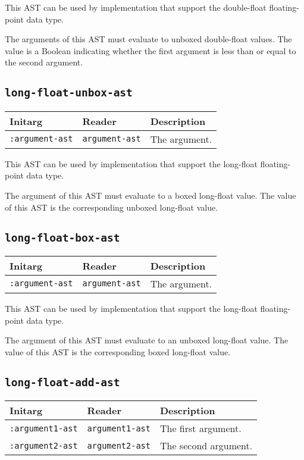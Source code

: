 This AST can be used by implementation that support the double-float
floating-point data type.  

The arguments of this AST must evaluate to unboxed double-float
values.  The value is a Boolean indicating whether the first argument
is less than or equal to the second argument.

\subsection{\texttt{long-float-unbox-ast}}
\label{sec-ast-long-float-unbox}

\begin{tabular}{|l|l|l|}
\hline
Initarg & Reader & Description\\
\hline\hline
\texttt{:argument-ast} & \texttt{argument-ast} & The argument.\\
\hline
\end{tabular}

This AST can be used by implementation that support the long-float
floating-point data type.  

The argument of this AST must evaluate to a boxed long-float value.
The value of this AST is the corresponding unboxed long-float value.

\subsection{\texttt{long-float-box-ast}}
\label{sec-ast-long-float-box}

\begin{tabular}{|l|l|l|}
\hline
Initarg & Reader & Description\\
\hline\hline
\texttt{:argument-ast} & \texttt{argument-ast} & The argument.\\
\hline
\end{tabular}

This AST can be used by implementation that support the long-float
floating-point data type.  

The argument of this AST must evaluate to an unboxed long-float
value.  The value of this AST is the corresponding boxed long-float
value.

\subsection{\texttt{long-float-add-ast}}
\label{sec-ast-long-float-add}

\begin{tabular}{|l|l|l|}
\hline
Initarg & Reader & Description\\
\hline\hline
\texttt{:argument1-ast} & \texttt{argument1-ast} & The first argument.\\
\hline
\texttt{:argument2-ast} & \texttt{argument2-ast} & The second argument.\\
\hline
\end{tabular}

